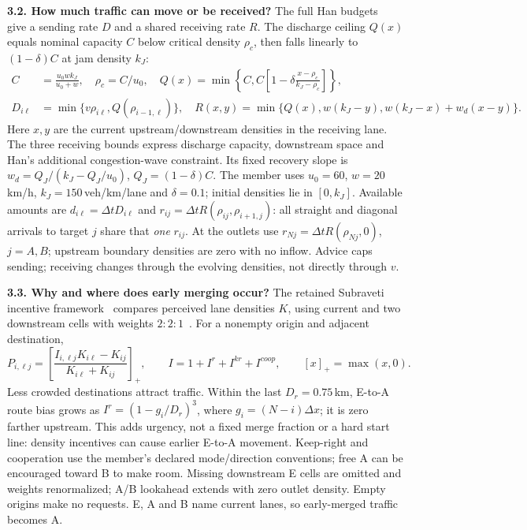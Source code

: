 \documentclass[11pt,a4paper]{article}
\begin{document}
\textbf{3.2. How much traffic can move or be received?}
The full Han budgets~\cite{han16,han17} give a sending rate $D$ and a
shared receiving rate $R$. The discharge ceiling $Q(x)$ equals nominal
capacity $C$ below critical density $\rho_c$, then falls linearly to
$(1-\delta)C$ at jam density $k_J$:
\begin{align}
 C&=\frac{u_0wk_J}{u_0+w},\quad \rho_c=C/u_0,\quad
 Q(x)=\min\!\left\{C,C\left[1-\delta\frac{x-\rho_c}{k_J-\rho_c}\right]\right\},\label{eq:ceiling}\\
 D_{i\ell}&=\min\{v\rho_{i\ell},Q(\rho_{i-1,\ell})\},\quad
 R(x,y)=\min\{Q(x),w(k_J-y),w(k_J-x)+w_d(x-y)\}.\label{eq:budgets}
\end{align}
Here $x,y$ are the current upstream/downstream densities in the receiving
lane. The three receiving bounds express discharge capacity, downstream
space and Han's additional congestion-wave constraint. Its fixed recovery
slope is $w_d=Q_J/(k_J-Q_J/u_0)$, $Q_J=(1-\delta)C$.
The member uses $u_0=60$, $w=20$\,km/h, $k_J=150$\,veh/km/lane and
$\delta=0.1$; initial densities lie in $[0,k_J]$.
Available amounts are $d_{i\ell}=\Delta t D_{i\ell}$ and
$r_{ij}=\Delta t R(\rho_{ij},\rho_{i+1,j})$: all straight and diagonal
arrivals to target $j$ share that \emph{one} $r_{ij}$.
At the outlets use $r_{Nj}=\Delta t R(\rho_{Nj},0)$, $j=A,B$;
upstream boundary densities are zero with no inflow. Advice caps sending;
receiving changes through the evolving densities, not directly through $v$.

\textbf{3.3. Why and where does early merging occur?}
The retained Subraveti incentive framework~\cite{ns} compares perceived
lane densities $K$, using current and two downstream cells with weights
$2{:}2{:}1$~\cite{thesis}. For a nonempty origin and adjacent destination,
\begin{equation}
 P_{i,\ell j}=\left[\frac{I_{i,\ell j}K_{i\ell}-K_{ij}}
 {K_{i\ell}+K_{ij}}\right]_+,\qquad
 I=1+I^r+I^{kr}+I^{coop},\qquad [x]_+=\max(x,0).\label{eq:desire}
\end{equation}
Less crowded destinations attract traffic. Within the last $D_r=0.75$\,km,
E-to-A route bias grows as $I^r=(1-g_i/D_r)^3$, where
$g_i=(N-i)\Delta x$; it is zero farther upstream. This adds urgency, not
a fixed merge fraction or a hard start line: density incentives can cause
earlier E-to-A movement. Keep-right and cooperation use the member's declared
mode/direction conventions; free A can be encouraged toward B to
make room. Missing downstream E cells are omitted and weights renormalized;
A/B lookahead extends with zero outlet density. Empty origins make no
requests. E, A and B name current lanes, so early-merged traffic becomes A.
\end{document}
